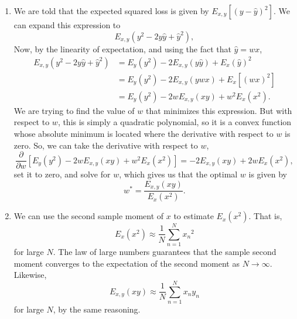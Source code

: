 \documentclass[submit]{harvardml}
\begin{document}
\begin{enumerate}
    \item We are told that the expected squared loss is given by $E_{x,y}[(y - \hat{y})^2]$.  We can expand this expression to
    \begin{equation*}
        E_{x,y}(y^2 - 2y\hat{y} + \hat{y}^2),
    \end{equation*}
    Now, by the linearity of expectation, and using the fact that $\hat{y} = wx$,
    \begin{align*}
        E_{x,y}(y^2 - 2y\hat{y} + \hat{y}^2) &= E_y(y^2) - 2E_{x,y}(y\hat{y}) + E_x(\hat{y})^2 \\
        &= E_y(y^2) - 2E_{x,y}(ywx) + E_x[(wx)^2] \\
        &= E_y(y^2) - 2w E_{x,y}(xy) + w^2 E_x(x^2).
    \end{align*}
    We are trying to find the value of $w$ that minimizes this expression.  But with respect to $w$, this is simply a quadratic polynomial, so it is a convex function whose absolute minimum is located where the derivative with respect to $w$ is zero.  So, we can take the derivative with respect to $w$,
    \begin{equation*}
        \frac{\partial}{\partial w} \left[ E_y(y^2) - 2w E_{x,y}(xy) + w^2 E_x(x^2) \right] = -2 E_{x,y}(xy) + 2w E_x(x^2),
    \end{equation*}
    set it to zero, and solve for $w$, which gives us that the optimal $w$ is given by
    \begin{equation*}
        w^* = \frac{E_{x,y}(xy)}{E_x(x^2)}.
    \end{equation*}
    
    \item We can use the second sample moment of $x$ to estimate $E_x(x^2)$. That is,
    \begin{equation*}
        E_x(x^2) \approx \frac{1}{N} \sum_{n=1}^N {x_n}^2
    \end{equation*}
    for large $N$.  The law of large numbers guarantees that the sample second moment converges to the expectation of the second moment as $N \rightarrow \infty$. Likewise,
    \begin{equation*}
        E_{x,y}(xy) \approx \frac{1}{N} \sum_{n=1}^N x_n y_n
    \end{equation*}
    for large $N$, by the same reasoning.
    

\end{enumerate}
\end{document}
